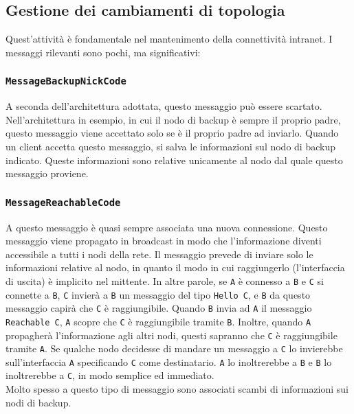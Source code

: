 \documentclass[10pt]{article} %
\begin{document}
\subsection{Gestione dei cambiamenti di topologia}
Quest'attività è fondamentale nel mantenimento della connettività intranet. I messaggi rilevanti sono pochi, ma significativi:
\subsubsection{{\tt MessageBackupNickCode}}
	A seconda dell'architettura adottata, questo messaggio può essere scartato. Nell'architettura in esempio, in cui il nodo di backup è sempre il proprio padre, questo messaggio viene accettato solo se è il proprio padre ad inviarlo. Quando un client accetta questo messaggio, si salva le informazioni sul nodo di backup indicato. Queste informazioni sono relative unicamente al nodo dal quale questo messaggio proviene.
\subsubsection{{\tt MessageReachableCode}}
	A questo messaggio è quasi sempre associata una nuova connessione. Questo messaggio viene propagato in broadcast in modo che l'informazione diventi accessibile a tutti i nodi della rete. Il messaggio prevede di inviare solo le informazioni relative al nodo, in quanto il modo in cui raggiungerlo (l'interfaccia di uscita) è implicito nel mittente. In altre parole, se {\tt A} è connesso a {\tt B} e {\tt C} si connette a {\tt B}, {\tt C} invierà a {\tt B} un messaggio del tipo {\tt Hello C}, e {\tt B} da questo messaggio capirà che {\tt C} è raggiungibile. Quando {\tt B} invia ad {\tt A} il messaggio {\tt Reachable C}, {\tt A} scopre che {\tt C} è raggiungibile tramite {\tt B}. Inoltre, quando {\tt A} propagherà l'informazione agli altri nodi, questi sapranno che {\tt C} è raggiungibile tramite {\tt A}. Se qualche nodo decidesse di mandare un messaggio a {\tt C} lo invierebbe sull'interfaccia {\tt A} specificando {\tt C} come destinatario. {\tt A} lo inoltrerebbe a {\tt B} e {\tt B} lo inoltrerebbe a {\tt C}, in modo semplice ed immediato. \\
	Molto spesso a questo tipo di messaggio sono associati scambi di informazioni sui nodi di backup.
\end{document}

